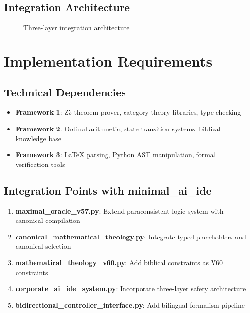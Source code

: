 \documentclass[12pt]{article}
\begin{document}
\subsection{Integration Architecture}

\begin{figure}[h]
\centering
{}
\caption{Three-layer integration architecture}
\end{figure}

\section{Implementation Requirements}

\subsection{Technical Dependencies}

\begin{itemize}
    \item \textbf{Framework 1}: Z3 theorem prover, category theory libraries, type checking
    \item \textbf{Framework 2}: Ordinal arithmetic, state transition systems, biblical knowledge base
    \item \textbf{Framework 3}: LaTeX parsing, Python AST manipulation, formal verification tools
\end{itemize}

\subsection{Integration Points with minimal\_ai\_ide}

\begin{enumerate}
    \item \textbf{maximal\_oracle\_v57.py}: Extend paraconsistent logic system with canonical compilation
    \item \textbf{canonical\_mathematical\_theology.py}: Integrate typed placeholders and canonical selection
    \item \textbf{mathematical\_theology\_v60.py}: Add biblical constraints as V60 constraints
    \item \textbf{corporate\_ai\_ide\_system.py}: Incorporate three-layer safety architecture
    \item \textbf{bidirectional\_controller\_interface.py}: Add bilingual formalism pipeline
\end{enumerate}
\end{document}
